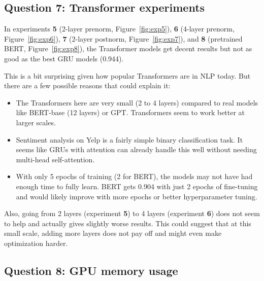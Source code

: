 \documentclass{article}
\begin{document}
\subsection*{Question 7: Transformer experiments}

In experiments \textbf{5} (2-layer prenorm, Figure~\ref{fig:exp5}), \textbf{6} (4-layer prenorm, Figure~\ref{fig:exp6}), \textbf{7} (2-layer postnorm, Figure~\ref{fig:exp7}), and \textbf{8} (pretrained BERT, Figure~\ref{fig:exp8}), the Transformer models get decent results but not as good as the best GRU models (0.944).

This is a bit surprising given how popular Transformers are in NLP today. But there are a few possible reasons that could explain it:
\begin{itemize}
  \item The Transformers here are very small (2 to 4 layers) compared to real models like BERT-base (12 layers) or GPT. Transformers seem to work better at larger scales.
  \item Sentiment analysis on Yelp is a fairly simple binary classification task. It seems like GRUs with attention can already handle this well without needing multi-head self-attention.
  \item With only 5 epochs of training (2 for BERT), the models may not have had enough time to fully learn. BERT gets 0.904 with just 2 epochs of fine-tuning and would likely improve with more epochs or better hyperparameter tuning.
\end{itemize}

Also, going from 2 layers (experiment \textbf{5}) to 4 layers (experiment \textbf{6}) does not seem to help and actually gives slightly worse results. This could suggest that at this small scale, adding more layers does not pay off and might even make optimization harder.

\subsection*{Question 8: GPU memory usage}
\end{document}
